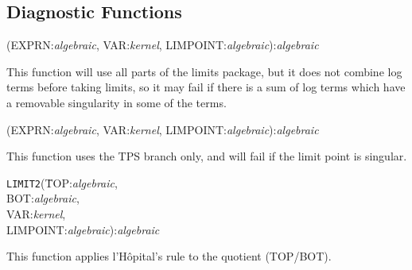 \subsection{Diagnostic Functions}

\hypertarget{operator:LIMIT0}{}
\vspace{.1in}
(EXPRN:{\em algebraic}, VAR:{\em kernel},
LIMPOINT:{\em algebraic}):{\em algebraic}
\vspace{.1in}

This function will use all parts of the limits package, but it does not
combine log terms before taking limits, so it may fail if there is a sum
of log terms which have a removable singularity in some of the terms.

\vspace{.1in}
(EXPRN:{\em algebraic}, VAR:{\em kernel},
LIMPOINT:{\em algebraic}):{\em algebraic}
\vspace{.1in}

This function uses the TPS branch only, and will fail if the limit point is
singular.

\hypertarget{operator:LIMIT2}{}
\vspace{.1in}
\begin{tabbing}
{\tt LIMIT2}(\=TOP:{\em algebraic}, \\
\>BOT:{\em algebraic}, \\
\>VAR:{\em kernel}, \\
\>LIMPOINT:{\em algebraic}):{\em algebraic}
\end{tabbing}
\vspace{.1in}

This function applies l'H\^opital's rule to the quotient (TOP/BOT).

